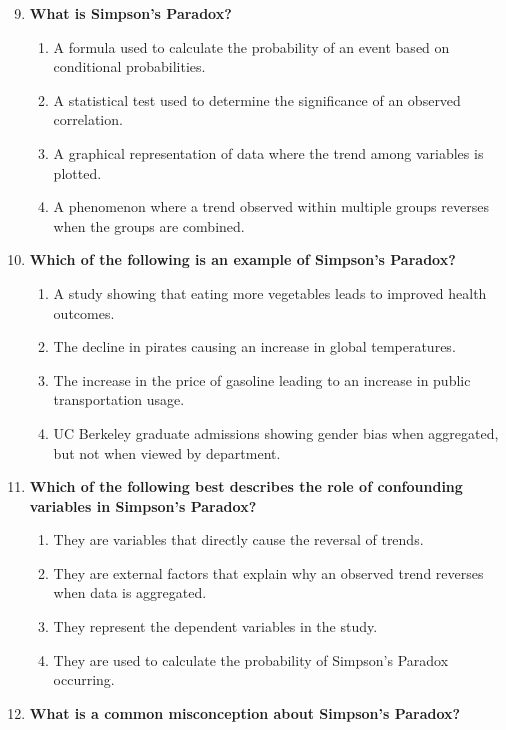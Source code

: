 \documentclass[11pt]{article}
\begin{document}
\begin{enumerate}
  \setcounter{enumi}{8}
  \item \textbf{What is Simpson's Paradox?}
    \begin{enumerate}
      \item A formula used to calculate the probability of an event based
        on conditional probabilities.
      \item A statistical test used to determine the significance of an
        observed correlation.
      \item A graphical representation of data where the trend among
        variables is plotted.
      \item A phenomenon where a trend observed within multiple groups
        reverses when the groups are combined.
    \end{enumerate}
  \item \textbf{Which of the following is an example of Simpson's Paradox?}
    \begin{enumerate}
      \item A study showing that eating more vegetables leads to improved
        health outcomes.
      \item The decline in pirates causing an increase in global
        temperatures.
      \item The increase in the price of gasoline leading to an increase
        in public transportation usage.
      \item UC Berkeley graduate admissions showing gender bias when
        aggregated, but not when viewed by department.
    \end{enumerate}
  \item \textbf{Which of the following best describes the role of
    confounding variables in Simpson's Paradox?}
    \begin{enumerate}
      \item They are variables that directly cause the reversal of trends.
      \item They are external factors that explain why an observed trend
        reverses when data is aggregated.
      \item They represent the dependent variables in the study.
      \item They are used to calculate the probability of Simpson's
        Paradox occurring.
    \end{enumerate}
  \item \textbf{What is a common misconception about Simpson's Paradox?}

\end{enumerate}
\end{document}
